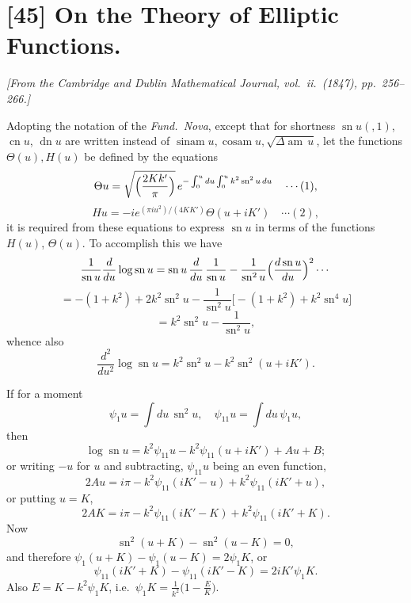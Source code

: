 \documentclass[12pt,a4paper]{article}
\begin{document}
\newpage

\section*{[45] On the Theory of Elliptic Functions.}

\textit{[From the Cambridge and Dublin Mathematical Journal, vol.~ii.~(1847), pp.~256--266.]}

\bigskip

Adopting the notation of the \emph{Fund.~Nova}, except that for shortness $\operatorname{sn} u(,1)$, $\operatorname{cn} u$, $\operatorname{dn} u$ are written instead of $\operatorname{sinam} u, \operatorname{cosam} u, \sqrt{\Delta\operatorname{am}\,u}$, let the functions $\Theta(u), H(u)$ be defined by the equations
\[
\Theta u = \sqrt{\Bigl(\frac{2Kk'}{\pi}\Bigr)}\,e^{-\int_0^u du \int_0^u k^2\operatorname{sn}^2 u\,du} \quad\cdots(1),
\]
\[
H u = -i e^{(\pi i u^2)/(4KK')}\Theta(u + iK') \quad\cdots(2),
\]
it is required from these equations to express $\operatorname{sn} u$ in terms of the functions $H(u)$, $\Theta(u)$. To accomplish this we have
\[
\frac{1}{\operatorname{sn} u}\frac{d}{du}\log\operatorname{sn} u = \operatorname{sn} u\,\frac{d}{du}\,\frac{1}{\operatorname{sn} u} - \frac{1}{\operatorname{sn}^2 u}\Bigl(\frac{d\operatorname{sn} u}{du}\Bigr)^2 \cdots
\]
\[
= -(1 + k^2) + 2k^2\operatorname{sn}^2 u - \frac{1}{\operatorname{sn}^2 u}\bigl[-(1 + k^2) + k^2\operatorname{sn}^4 u\bigr]
\]
\[
= k^2\operatorname{sn}^2 u - \frac{1}{\operatorname{sn}^2 u},
\]
whence also
\[
\frac{d^2}{du^2}\log\operatorname{sn} u = k^2\operatorname{sn}^2 u - k^2\operatorname{sn}^2(u + iK').
\]

If for a moment
\[
\psi_1 u = \int du\,\operatorname{sn}^2 u,\quad \psi_{11} u = \int du\,\psi_1 u,
\]
then
\[
\log\operatorname{sn} u = k^2\psi_{11} u - k^2\psi_{11}(u + iK') + Au + B;
\]
or writing $-u$ for $u$ and subtracting, $\psi_{11} u$ being an even function,
\[
2Au = i\pi - k^2\psi_{11}(iK' - u) + k^2\psi_{11}(iK' + u),
\]
or putting $u = K$,
\[
2AK = i\pi - k^2\psi_{11}(iK' - K) + k^2\psi_{11}(iK' + K).
\]
Now
\[
\operatorname{sn}^2(u + K) - \operatorname{sn}^2(u - K) = 0,
\]
and therefore $\psi_1(u + K) - \psi_1(u - K) = 2\psi_1 K$,
or
\[
\psi_{11}(iK' + K) - \psi_{11}(iK' - K) = 2iK'\psi_1 K.
\]
Also $E = K - k^2\psi_1 K$, i.e.\ $\psi_1 K = \frac{1}{k^2}\bigl(1 - \frac{E}{K}\bigr)$.
\end{document}
